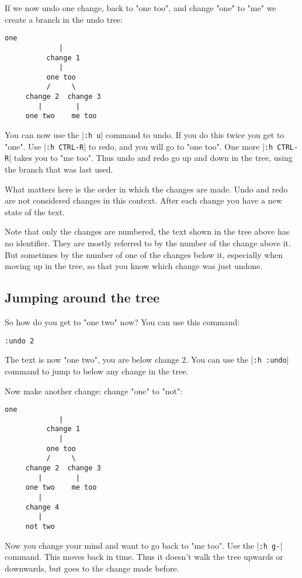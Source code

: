 If we now undo one change, back to "one too", and change "one" to "me" we create a branch in the undo tree:

\begin{Verbatim}[samepage=true]
            one 
             |
          change 1
             |
          one too 
          /     \
     change 2  change 3
        |        |
     one two    me too 
\end{Verbatim}

You can now use the |\verb!:h u!| command to undo.
If you do this twice you get to "one".
Use |\verb!:h CTRL-R!| to redo, and you will go to "one too".
One more |\verb!:h CTRL-R!| takes you to "me too".
Thus undo and redo go up and down in the tree, using the branch that was last used.

What matters here is the order in which the changes are made.
Undo and redo are not considered changes in this context.
After each change you have a new state of the text.

Note that only the changes are numbered, the text shown in the tree above has no identifier.
They are mostly referred to by the number of the change above it.
But sometimes by the number of one of the changes below it, especially when moving up in the tree, so that you know which change was just undone.
\subsection{Jumping around the tree}
So how do you get to "one two" now?  You can use this command:

\begin{Verbatim}[samepage=true]
 :undo 2
\end{Verbatim}

The text is now "one two", you are below change 2.
You can use the |\verb!:h :undo!| command to jump to below any change in the tree.

Now make another change: change "one" to "not":

\begin{Verbatim}[samepage=true]
            one 
             |
          change 1
             |
          one too 
          /     \
     change 2  change 3
        |        |
     one two    me too 
        |
     change 4
        |
     not two 
\end{Verbatim}

Now you change your mind and want to go back to "me too".
Use the |\verb!:h g-!| command.
This moves back in time.
Thus it doesn't walk the tree upwards or downwards, but goes to the change made before.

